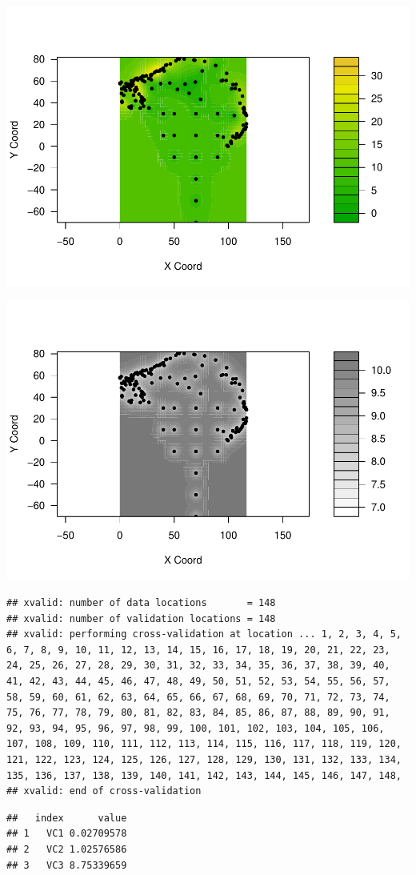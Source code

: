 \documentclass[
]{article}
\begin{document}
\includegraphics{Assignment_1_files/figure-latex/unnamed-chunk-61-1.pdf}

\includegraphics{Assignment_1_files/figure-latex/unnamed-chunk-62-1.pdf}

\begin{verbatim}
## xvalid: number of data locations       = 148
## xvalid: number of validation locations = 148
## xvalid: performing cross-validation at location ... 1, 2, 3, 4, 5, 6, 7, 8, 9, 10, 11, 12, 13, 14, 15, 16, 17, 18, 19, 20, 21, 22, 23, 24, 25, 26, 27, 28, 29, 30, 31, 32, 33, 34, 35, 36, 37, 38, 39, 40, 41, 42, 43, 44, 45, 46, 47, 48, 49, 50, 51, 52, 53, 54, 55, 56, 57, 58, 59, 60, 61, 62, 63, 64, 65, 66, 67, 68, 69, 70, 71, 72, 73, 74, 75, 76, 77, 78, 79, 80, 81, 82, 83, 84, 85, 86, 87, 88, 89, 90, 91, 92, 93, 94, 95, 96, 97, 98, 99, 100, 101, 102, 103, 104, 105, 106, 107, 108, 109, 110, 111, 112, 113, 114, 115, 116, 117, 118, 119, 120, 121, 122, 123, 124, 125, 126, 127, 128, 129, 130, 131, 132, 133, 134, 135, 136, 137, 138, 139, 140, 141, 142, 143, 144, 145, 146, 147, 148, 
## xvalid: end of cross-validation
\end{verbatim}

\begin{verbatim}
##   index      value
## 1   VC1 0.02709578
## 2   VC2 1.02576586
## 3   VC3 8.75339659
\end{verbatim}
\end{document}
